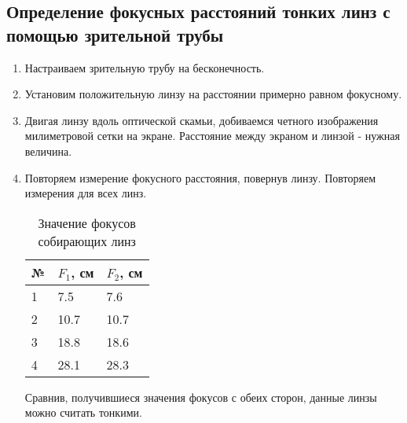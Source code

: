 \documentclass[12pt,a4paper]{article}
\begin{document}
\subsection{Определение фокусных расстояний тонких линз с помощью зрительной трубы}
\begin{enumerate}
    \item Настраиваем зрительную трубу на бесконечность.
    \item Установим положительную линзу на расстоянии примерно равном фокусному.
    \item Двигая линзу вдоль оптической скамьи, добиваемся четного изображения  милиметровой сетки на экране. Расстояние между экраном и линзой - нужная величина. 
    \item Повторяем измерение фокусного расстояния, повернув линзу. Повторяем измерения для всех линз.
    
    \begin{table}[H]
        \centering
        \begin{center}
        \end{center}
        \vspace{0.1cm}
        \label{tab:my_label}
        \begin{tabular}{ |p{2cm}|p{2cm}|p{2cm}|}
     \hline
     № & $F_1$, см &  $F_2$, см \\
     \hline
     1 & 7.5 & 7.6 \\
     \hline
     2 & 10.7 & 10.7\\
     \hline
     3  & 18.8 & 18.6\\
       \hline
     4 & 28.1 & 28.3\\
    \hline
    \end{tabular}
    \caption{Значение фокусов собирающих линз}
    \end{table}
    
    Сравнив, получившиеся значения фокусов с обеих сторон, данные линзы можно считать тонкими.


\end{enumerate}
\end{document}
